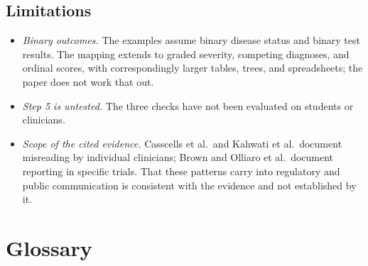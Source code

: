 \documentclass[11pt]{article}
\begin{document}
\subsection{Limitations}

\begin{itemize}[leftmargin=1.5em,itemsep=0.2em]
  \item \emph{Binary outcomes.} The examples assume binary disease status and binary test results. The mapping extends to graded severity, competing diagnoses, and ordinal scores, with correspondingly larger tables, trees, and spreadsheets; the paper does not work that out.
  \item \emph{Step 5 is untested.} The three checks have not been evaluated on students or clinicians.
  \item \emph{Scope of the cited evidence.} Casscells et al.\ and Kahwati et al.\ document misreading by individual clinicians; Brown and Olliaro et al.\ document reporting in specific trials. That these patterns carry into regulatory and public communication is consistent with the evidence and not established by it.
\end{itemize}

\section*{Glossary}
\end{document}
